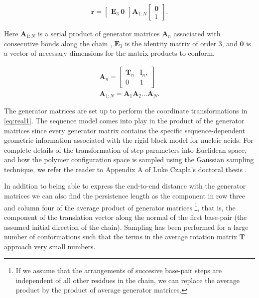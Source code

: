 \begin{gather}
\mathbf{r}=  \begin{bmatrix}\mathbf{E}_{3}~  \mathbf{0}  \end{bmatrix}
\mathbf{A}_{1:N}\begin{bmatrix} \mathbf{0} \\ 1 \end{bmatrix} .
\end{gather}

Here  $\mathbf{A}_{1:N}$ is  a  serial product  of generator  matrices
$\mathbf{A}_{n}$  associated with  consecutive bonds  along  the chain
\cite{flory1969,  maroun1988a,  marky1994a},  $\mathbf{E}_{3}$ is  the
identity matrix of order 3,  and $\mathbf{0}$ is a vector of necessary
dimensions for the matrix products to conform.

\begin{gather}
\mathbf{A}_{n} =
\begin{bmatrix}
\mathbf{T}_{n} & \mathbf{l}_{n} ,\\
0 & 1
\end{bmatrix}\\
\mathbf{A}_{1:N}=\mathbf{A}_{1}\mathbf{A}_{2}...\mathbf{A}_{N} .
\end{gather}

The  generator   matrices  are  set  up  to   perform  the  coordinate
transformations in \ref{eq:real1}. The  sequence model comes into play
in the product of the  generator matrices since every generator matrix
contains   the  specific   sequence-dependent   geometric  information
associated with the rigid block model for nucleic acids.  For complete
details of the transformation  of step parameters into Euclidean space,
and how the polymer configuration  space is sampled using the Gaussian
sampling technique, we refer the reader to Appendix A of Luke Czapla's
doctoral thesis \cite{czapla2009}.

In addition to being able  to express the end-to-end distance with the
generator  matrices we  can also  find the  persistence length  as the
component  in row  three and  column four  of the  average  product of
generator  matrices \footnote{If  we assume  that the  arrangements of
  succesive base-pair  steps are independent of all  other residues in
  the  chain, we can  replace the  average product  by the  product of
  average  generator  matrices.},  that   is,  the  component  of  the
translation  vector  along the  normal  of  the  first base-pair  (the
assumed initial  direction of the chain). Sampling  has been performed
for a large number of conformations such that the terms in the average
rotation matrix $\mathbf{T}$ approach very small numbers.

